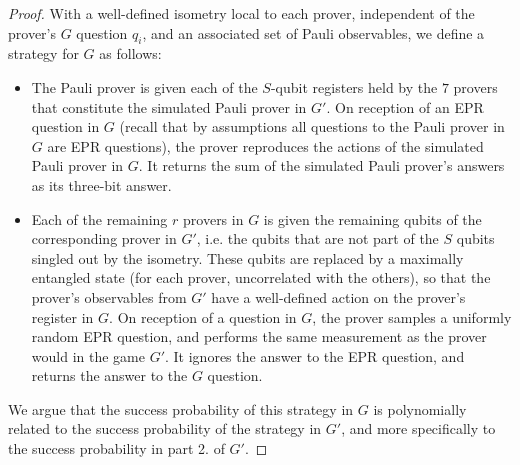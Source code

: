 \begin{proof}
With a well-defined isometry local to each prover, independent of the prover's $G$ question $q_i$, and an associated set of Pauli observables, we define a strategy for $G$ as follows:
\begin{itemize}
\item The Pauli prover is given each of the $S$-qubit registers held by the $7$ provers that constitute the simulated Pauli prover in $G'$. On reception of an EPR question in $G$ (recall that by assumptions all questions to the Pauli prover in $G$ are EPR questions), the prover reproduces the actions of the simulated Pauli prover in $G$. It returns the sum of the simulated Pauli prover's answers as its three-bit answer. 
\item Each of the remaining $r$ provers in $G$ is given the remaining qubits of the corresponding prover in $G'$, i.e. the qubits that are not part of the $S$ qubits singled out by the isometry. These qubits are replaced by a maximally entangled state (for each prover, uncorrelated with the others), so that the prover's observables from $G'$ have a well-defined action on the prover's register in $G$. On reception of a question in $G$, the prover samples a uniformly random EPR question, and performs the same measurement as the prover would in the game $G'$. It ignores the answer to the EPR question, and returns the answer to the $G$ question. 
\end{itemize} 
We argue that the success probability of this strategy in $G$ is polynomially related to the success probability of the strategy in $G'$, and more specifically to the success probability in part 2. of $G'$. 
\end{proof}